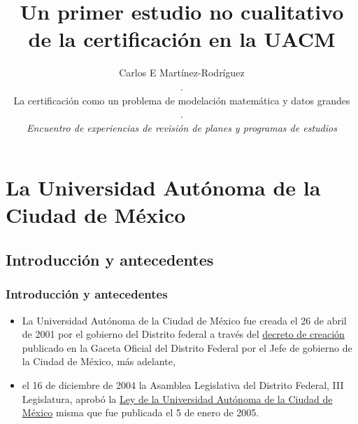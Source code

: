 \documentclass[xcolor=dvipsnames]{beamer}
\title{Un primer estudio no cualitativo de la certificaci\'on en la UACM}
\author{Carlos E Mart\'inez-Rodr\'iguez\\
.\\
\tiny{La certificaci\'on como un problema de modelaci\'on
matem\'atica y datos grandes}\\
.\\
\tiny{\textit{Encuentro de experiencias de revisi\'on de planes y programas de estudios}}
}
\begin{document}
\begin{frame}
  \maketitle

\end{frame}


\section*{}
\small
\begin{frame}
\tableofcontents
\end{frame}
%

\justifying



\section{La Universidad Aut\'onoma de la Ciudad de M\'exico}
\subsection{Introducci\'on y antecedentes}


\begin{frame}\frametitle{Introducci\'on y antecedentes}


\begin{itemize}

\item La Universidad Aut\'onoma de la Ciudad de M\'exico fue creada el 26 de abril de 2001 por el gobierno del Distrito federal a trav\'es del \href{https://www.uacm.edu.mx/Portals/0/adam/Content/hfXbhKHHXE2k2Y8j2fG9UQ/Text/DCUACM.pdf}{decreto de creaci\'on} publicado en la Gaceta Oficial del Distrito Federal por el Jefe de gobierno de la Ciudad de M\'exico, m\'as adelante, 

\item el 16 de diciembre de 2004 la Asamblea Legislativa del Distrito Federal, III Legislatura, aprob\'o la \href{https://www.uacm.edu.mx/Portals/0/ley_uacm092011.pdf}{Ley de la Universidad Aut\'onoma de la Ciudad de M\'exico} misma que fue publicada el 5 de enero de 2005.

\end{itemize}
\end{frame}
\end{document}
